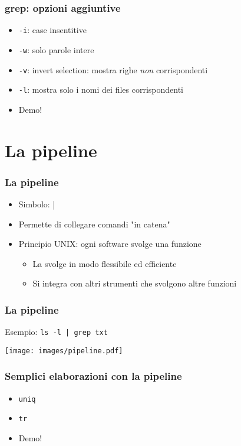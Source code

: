 \documentclass[xetex,table]{beamer}
\begin{document}
\begin{frame}
  \frametitle{grep: opzioni aggiuntive}
  \begin{itemize}
  \item \texttt{-i}: case insentitive
  \item \texttt{-w}: solo parole intere
  \item \texttt{-v}: invert selection: mostra righe {\em non} corrispondenti
  \item \texttt{-l}: mostra solo i nomi dei files corrispondenti
  \item Demo!
  \end{itemize}
\end{frame}

\section{La pipeline}

\begin{frame}
  \frametitle{La pipeline}
  \begin{itemize}
  \item Simbolo: |
  \item Permette di collegare comandi "in catena"
  \item Principio UNIX: ogni software svolge una funzione
    \begin{itemize}
    \item La svolge in modo flessibile ed efficiente
    \item Si integra con altri strumenti che svolgono altre funzioni
    \end{itemize}
  \end{itemize}
\end{frame}

\begin{frame}
  \frametitle{La pipeline}
  Esempio: \texttt{ls -l | grep txt}
  \begin{center}
    \texttt{[image: images/pipeline.pdf]}
  \end{center}
\end{frame}

\begin{frame}
  \frametitle{Semplici elaborazioni con la pipeline}
  \begin{itemize}
  \item \texttt{uniq}
  \item \texttt{tr}
  \item Demo!
  \end{itemize}
\end{frame}
\end{document}
